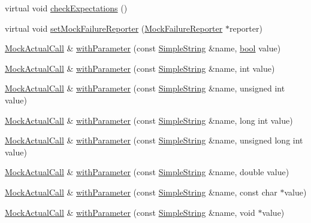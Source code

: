 \begin{DoxyCompactItemize}
\item 
virtual void \hyperlink{class_mock_checked_actual_call_aaf94db2d926ab0a1cae9fc65c7eec54c}{check\+Expectations} ()
\item 
virtual void \hyperlink{class_mock_checked_actual_call_a1b9b1fb529e5087761657bfdabe4ea12}{set\+Mock\+Failure\+Reporter} (\hyperlink{class_mock_failure_reporter}{Mock\+Failure\+Reporter} $\ast$reporter)
\item 
\hyperlink{class_mock_actual_call}{Mock\+Actual\+Call} \& \hyperlink{class_mock_actual_call_a158f3ada8f73127b977d5353d4e4dea0}{with\+Parameter} (const \hyperlink{class_simple_string}{Simple\+String} \&name, \hyperlink{avb__gptp_8h_af6a258d8f3ee5206d682d799316314b1}{bool} value)
\item 
\hyperlink{class_mock_actual_call}{Mock\+Actual\+Call} \& \hyperlink{class_mock_actual_call_abec25d19fe41e8acb31af0130704aa6b}{with\+Parameter} (const \hyperlink{class_simple_string}{Simple\+String} \&name, int value)
\item 
\hyperlink{class_mock_actual_call}{Mock\+Actual\+Call} \& \hyperlink{class_mock_actual_call_ae18a228b6f5e0260c239a22fd94c2353}{with\+Parameter} (const \hyperlink{class_simple_string}{Simple\+String} \&name, unsigned int value)
\item 
\hyperlink{class_mock_actual_call}{Mock\+Actual\+Call} \& \hyperlink{class_mock_actual_call_ac481a5b2a6c2b48d081b88d514f94332}{with\+Parameter} (const \hyperlink{class_simple_string}{Simple\+String} \&name, long int value)
\item 
\hyperlink{class_mock_actual_call}{Mock\+Actual\+Call} \& \hyperlink{class_mock_actual_call_aeb2eccd3b3b4d5820e35401d6daec7b2}{with\+Parameter} (const \hyperlink{class_simple_string}{Simple\+String} \&name, unsigned long int value)
\item 
\hyperlink{class_mock_actual_call}{Mock\+Actual\+Call} \& \hyperlink{class_mock_actual_call_ae2623cd5773f529096615eb84bc2a88d}{with\+Parameter} (const \hyperlink{class_simple_string}{Simple\+String} \&name, double value)
\item 
\hyperlink{class_mock_actual_call}{Mock\+Actual\+Call} \& \hyperlink{class_mock_actual_call_ab299726011d5c80eabc64589a07caab4}{with\+Parameter} (const \hyperlink{class_simple_string}{Simple\+String} \&name, const char $\ast$value)
\item 
\hyperlink{class_mock_actual_call}{Mock\+Actual\+Call} \& \hyperlink{class_mock_actual_call_a73f6c72584163c0853b8c76b61f5d8d2}{with\+Parameter} (const \hyperlink{class_simple_string}{Simple\+String} \&name, void $\ast$value)

\end{DoxyCompactItemize}
